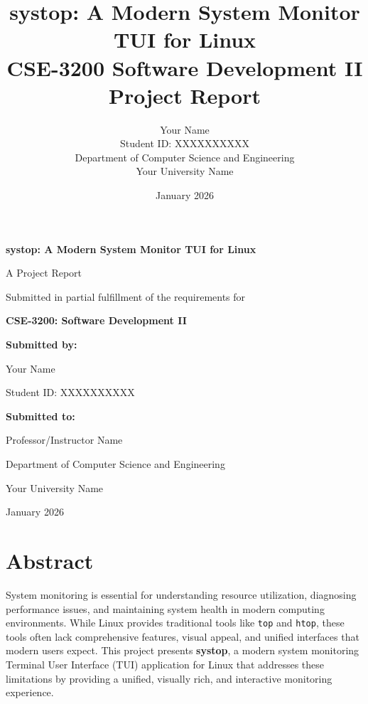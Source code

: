 \documentclass[12pt,a4paper,oneside]{report}
\title{
    \textbf{systop: A Modern System Monitor TUI for Linux}\\
    \vspace{1cm}
    \large CSE-3200 Software Development II\\
    Project Report
}
\author{Your Name\\
Student ID: XXXXXXXXXX\\
\vspace{0.5cm}
Department of Computer Science and Engineering\\
Your University Name}
\date{January 2026}
\begin{document}
\begin{titlepage}
    \centering
    \vspace*{2cm}
    
    {\LARGE\bfseries systop: A Modern System Monitor TUI for Linux\par}
    \vspace{1.5cm}
    
    {\Large A Project Report\par}
    \vspace{0.5cm}
    {\large Submitted in partial fulfillment of the requirements for\par}
    \vspace{0.3cm}
    {\Large\bfseries CSE-3200: Software Development II\par}
    \vspace{2cm}
    
    {\large\bfseries Submitted by:\par}
    \vspace{0.3cm}
    {\large Your Name\par}
    {\normalsize Student ID: XXXXXXXXXX\par}
    \vspace{2cm}
    
    {\large\bfseries Submitted to:\par}
    \vspace{0.3cm}
    {\large Professor/Instructor Name\par}
    \vspace{0.3cm}
    {\normalsize Department of Computer Science and Engineering\par}
    {\normalsize Your University Name\par}
    \vfill
    
    {\large January 2026\par}
\end{titlepage}

\tableofcontents
{}

\chapter*{Abstract}

System monitoring is essential for understanding resource utilization, diagnosing performance issues, and maintaining system health in modern computing environments. While Linux provides traditional tools like \texttt{top} and \texttt{htop}, these tools often lack comprehensive features, visual appeal, and unified interfaces that modern users expect. This project presents \textbf{systop}, a modern system monitoring Terminal User Interface (TUI) application for Linux that addresses these limitations by providing a unified, visually rich, and interactive monitoring experience.
\end{document}
